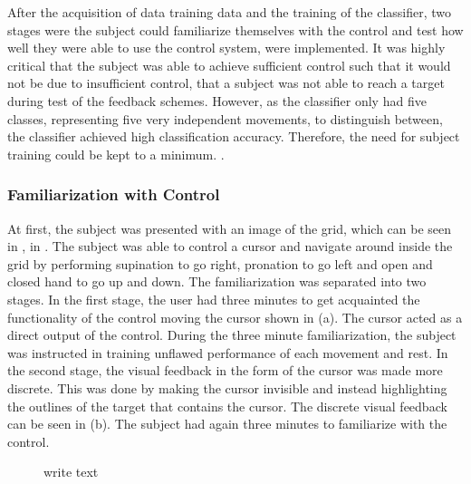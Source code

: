 After the acquisition of data training data and the training of the classifier, two stages were the subject could familiarize themselves with the control and test how well they were able to use the control system, were implemented. It was highly critical that the subject was able to achieve sufficient control such that it would not be due to insufficient control, that a subject was not able to reach a target during test of the feedback schemes. However, as the classifier only had five classes, representing five very independent movements, to distinguish between, the classifier achieved high classification accuracy. Therefore, the need for subject training could be kept to a minimum. .  

\subsubsection{Familiarization with Control}

At first, the subject was presented with an image of the grid, which can be seen in , in . The subject was able to control a cursor and navigate around inside the grid by performing supination to go right, pronation to go left and open and closed hand to go up and down. The familiarization was separated into two stages. In the first stage, the user had three minutes to get acquainted the functionality of the control moving the cursor shown in  (a). The cursor acted as a direct output of the control. During the three minute familiarization, the subject was instructed in training unflawed performance of each movement and rest. In the second stage, the visual feedback in the form of the cursor was made more discrete. This was done by making the cursor invisible and instead highlighting the outlines of the target that contains the cursor. The discrete visual feedback can be seen in  (b). The subject had again three minutes to familiarize with the control. 

\begin{figure}[H]
	\hspace{0.9cm}
	\caption{write text}
	\label{fig:C1}
\end{figure}

